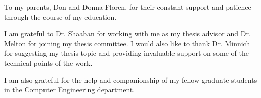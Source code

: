 \documentclass[11pt,american]{report}
\begin{document}
\beforepreface%

\vfill
\begin{center}
To my parents, Don and Donna Floren, for their constant support and patience through the course of my education.
\end{center}
\vfill

%
\vfill
\begin{center}
\indent I am grateful to Dr. Shaaban for working with me as my thesis advisor and Dr. Melton for joining my thesis committee. I would also like to thank Dr. Minnich for suggesting my thesis topic and providing invaluable support on some of the technical points of the work.

I am also grateful for the help and companionship of my fellow graduate students in the Computer Engineering department.
\end{center}
\vfill

\newcommand{\etc} {\emph{etc.\/}}
\newcommand{\etal}{\emph{et~al.\/}}
\newcommand{\eg}  {\emph{e.g.\/}}
\newcommand{\ie}  {\emph{i.e.\/}}
\end{document}
